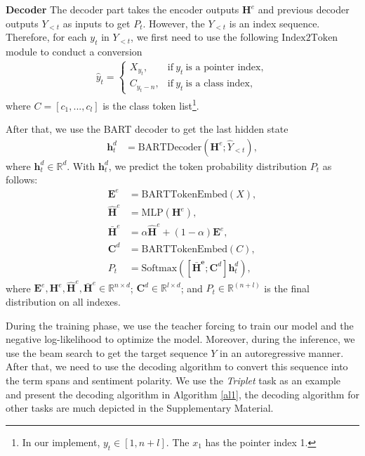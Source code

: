\documentclass[11pt,a4paper]{article}
\begin{document}
\textbf{Decoder} The decoder part takes the encoder outputs $\mathbf{H}^e$ and previous decoder outputs $Y_{<t}$ as inputs to get $P_t$. However, the $Y_{<t}$ is  an  index sequence. Therefore, for each $y_t$ in $Y_{<t}$, we first need to use the following $\mathrm{Index2Token}$ module to conduct a conversion
\begin{align}
  \hat{y}_t = \begin{cases}
    X_{y_t},&  \text{if}  \  y_t \  \text{is a pointer index},\\
    C_{y_t - n},&  \text{if} \  y_t \  \text{is a class index},
  \end{cases}
\end{align}
where $C=[c_1, ..., c_l]$ is the class token list\footnote{In our implement, $y_t \in [1, n+l]$. The $x_1$ has the pointer index 1. }.

After that, we use the BART decoder to get the last hidden state
\begin{align}
  \mathbf{h}_t^d & = \mathrm{BARTDecoder}(\mathbf{H}^e; \hat{Y}_{<t}),
\end{align}
where $\mathbf{h}_t^d \in \mathbb{R}^d$. With $\mathbf{h}_t^d$, we predict the token probability distribution $P_t$ as follows:
\begin{align}
  \mathbf{E}^e & = \mathrm{BARTTokenEmbed}(X),\\
  \mathbf{\hat{H}}^e & = \mathrm{MLP}(\mathbf{H}^e), \\
  \mathbf{\bar{H}}^e & = \alpha \mathbf{\hat{H}}^e + (1-\alpha) \mathbf{E}^e, \\
  \mathbf{C}^d & = \mathrm{BARTTokenEmbed}(C), \\
  P_t & = \mathrm{Softmax}([\mathbf{\bar{H}^e};\mathbf{C}^d]  \mathbf{h}_t^d),
\end{align}
where $\mathbf{E}^e,\mathbf{H}^e,\mathbf{\hat{H}}^e,\mathbf{\bar{H}}^e \in \mathbb{R}^{n \times d}$;  $\mathbf{C}^d \in \mathbb{R}^{l \times d}$; and $P_t \in \mathbb{R}^{(n + l)}$ is the final distribution on all indexes.



During the training phase, we use the teacher forcing to train our model and the negative log-likelihood to optimize the model. Moreover, during the inference, we use the beam search to get the target sequence $Y$ in an autoregressive manner. After that, we need to use the decoding algorithm to convert this sequence into the term spans and sentiment polarity. We use the \emph{Triplet} task as an example and present the decoding algorithm in Algorithm \ref{al1}, the decoding algorithm for other tasks are much depicted in the Supplementary Material.
\end{document}
